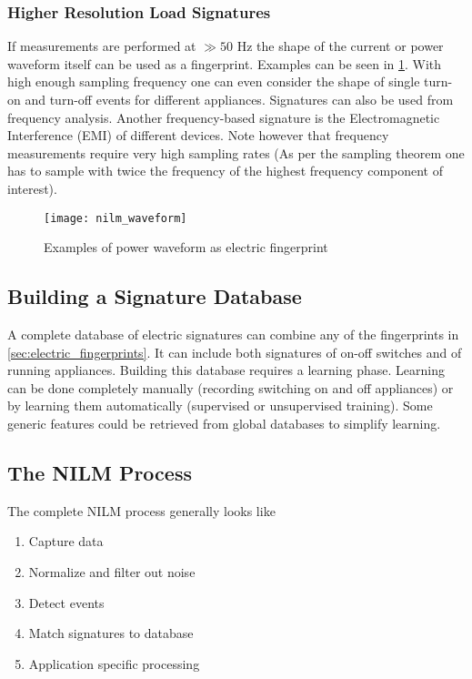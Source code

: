 \subsubsection{Higher Resolution Load Signatures}
If measurements are performed at $\gg 50$ Hz the shape of the current or power waveform itself can be used as a fingerprint.
Examples can be seen in \ref{fig:nilm_waveform}.
With high enough sampling frequency one can even consider the shape of single turn-on and turn-off events for different appliances.
Signatures can also be used from frequency analysis.
Another frequency-based signature is the Electromagnetic Interference (EMI) of different devices.
Note however that frequency measurements require very high sampling rates (As per the sampling theorem one has to sample with twice the frequency of the highest frequency component of interest).

\begin{figure}
    \centering
    \texttt{[image: nilm\_waveform]}
    \caption{Examples of power waveform as electric fingerprint}
    \label{fig:nilm_waveform}
\end{figure}

\subsection{Building a Signature Database}
A complete database of electric signatures can combine any of the fingerprints in \ref{sec:electric_fingerprints}.
It can include both signatures of on-off switches and of running appliances.
Building this database requires a learning phase.
Learning can be done completely manually (recording switching on and off appliances) or by learning them automatically (supervised or unsupervised training).
Some generic features could be retrieved from global databases to simplify learning.\\

\subsection{The NILM Process}
The complete NILM process generally looks like

\begin{enumerate}
    \item Capture data
    \item Normalize and filter out noise
    \item Detect events
    \item Match signatures to database
    \item Application specific processing
\end{enumerate}

